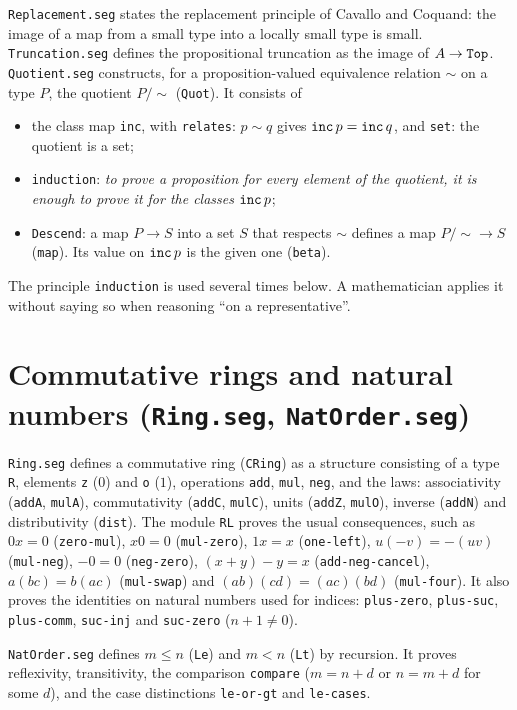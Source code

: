 \documentclass[11pt]{amsart}
\theoremstyle{definition}
\theoremstyle{remark}
\newcommand{\nm}[1]{\textup{\texttt{#1}}}
\newcommand{\file}[1]{\textup{\texttt{#1.seg}}}
\begin{document}
\file{Replacement} states the replacement principle of Cavallo and
Coquand: the image of a map from a small type into a locally small type is
small. \file{Truncation} defines the propositional truncation as the image
of $A\to\nm{Top}$. \file{Quotient} constructs, for a proposition-valued
equivalence relation $\sim$ on a type $P$, the quotient $P/{\sim}$
(\nm{Quot}). It consists of
\begin{itemize}
\item the class map \nm{inc}, with \nm{relates}: $p\sim q$ gives
  $\nm{inc}\,p = \nm{inc}\,q$, and \nm{set}: the quotient is a set;
\item \nm{induction}: \emph{to prove a proposition for every element of
  the quotient, it is enough to prove it for the classes $\nm{inc}\,p$};
\item \nm{Descend}: a map $P\to S$ into a set $S$ that respects $\sim$
  defines a map $P/{\sim}\to S$ (\nm{map}). Its value on $\nm{inc}\,p$ is
  the given one (\nm{beta}).
\end{itemize}
The principle \nm{induction} is used several times below. A
mathematician applies it without saying so when reasoning ``on a
representative''.

\section{Commutative rings and natural numbers (\file{Ring},
\file{NatOrder})}

\file{Ring} defines a commutative ring (\nm{CRing}) as a structure
consisting of a type \nm{R}, elements \nm{z} ($0$) and \nm{o} ($1$),
operations \nm{add}, \nm{mul}, \nm{neg}, and the laws: associativity
(\nm{addA}, \nm{mulA}), commutativity (\nm{addC}, \nm{mulC}), units
(\nm{addZ}, \nm{mulO}), inverse (\nm{addN}) and distributivity (\nm{dist}).
The module \nm{RL} proves the usual consequences, such as $0x=0$
(\nm{zero-mul}), $x0=0$ (\nm{mul-zero}), $1x=x$ (\nm{one-left}),
$u(-v)=-(uv)$ (\nm{mul-neg}), $-0=0$ (\nm{neg-zero}),
$(x+y)-y=x$ (\nm{add-neg-cancel}), $a(bc)=b(ac)$ (\nm{mul-swap}) and
$(ab)(cd)=(ac)(bd)$ (\nm{mul-four}). It also proves the identities on
natural numbers used for indices: \nm{plus-zero}, \nm{plus-suc},
\nm{plus-comm}, \nm{suc-inj} and \nm{suc-zero} ($n+1\neq0$).

\file{NatOrder} defines $m\le n$ (\nm{Le}) and $m<n$ (\nm{Lt}) by
recursion. It proves reflexivity, transitivity, the comparison
\nm{compare} ($m=n+d$ or $n=m+d$ for some $d$), and the case distinctions
\nm{le-or-gt} and \nm{le-cases}.
\end{document}
